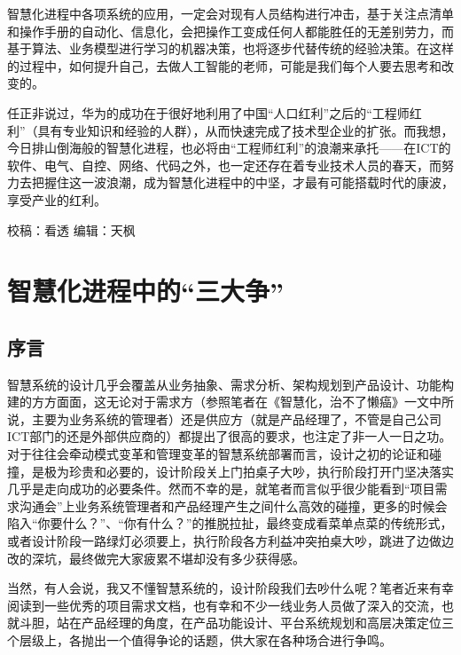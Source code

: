 \documentclass[]{book}
\begin{document}
智慧化进程中各项系统的应用，一定会对现有人员结构进行冲击，基于关注点清单和操作手册的自动化、信息化，会把操作工变成任何人都能胜任的无差别劳力，而基于算法、业务模型进行学习的机器决策，也将逐步代替传统的经验决策。在这样的过程中，如何提升自己，去做人工智能的老师，可能是我们每个人要去思考和改变的。

任正非说过，华为的成功在于很好地利用了中国``人口红利''之后的``工程师红利''（具有专业知识和经验的人群），从而快速完成了技术型企业的扩张。而我想，今日排山倒海般的智慧化进程，也必将由``工程师红利''的浪潮来承托------在ICT的软件、电气、自控、网络、代码之外，也一定还存在着专业技术人员的春天，而努力去把握住这一波浪潮，成为智慧化进程中的中坚，才最有可能搭载时代的康波，享受产业的红利。

校稿：看透
编辑：天枫

\hypertarget{ux667aux6167ux5316ux8fdbux7a0bux4e2dux7684ux4e09ux5927ux4e89}{%
\section{智慧化进程中的``三大争''}\label{ux667aux6167ux5316ux8fdbux7a0bux4e2dux7684ux4e09ux5927ux4e89}}

\hypertarget{ux5e8fux8a00-1}{%
\subsection{序言}\label{ux5e8fux8a00-1}}

智慧系统的设计几乎会覆盖从业务抽象、需求分析、架构规划到产品设计、功能构建的方方面面，这无论对于需求方（参照笔者在《智慧化，治不了懒癌》一文中所说，主要为业务系统的管理者）还是供应方（就是产品经理了，不管是自己公司ICT部门的还是外部供应商的）都提出了很高的要求，也注定了非一人一日之功。对于往往会牵动模式变革和管理变革的智慧系统部署而言，设计之初的论证和碰撞，是极为珍贵和必要的，设计阶段关上门拍桌子大吵，执行阶段打开门坚决落实几乎是走向成功的必要条件。然而不幸的是，就笔者而言似乎很少能看到``项目需求沟通会''上业务系统管理者和产品经理产生之间什么高效的碰撞，更多的时候会陷入``你要什么？''、``你有什么？''的推脱拉扯，最终变成看菜单点菜的传统形式，或者设计阶段一路绿灯必须要上，执行阶段各方利益冲突拍桌大吵，跳进了边做边改的深坑，最终做完大家疲累不堪却没有多少获得感。

当然，有人会说，我又不懂智慧系统的，设计阶段我们去吵什么呢？笔者近来有幸阅读到一些优秀的项目需求文档，也有幸和不少一线业务人员做了深入的交流，也就斗胆，站在产品经理的角度，在产品功能设计、平台系统规划和高层决策定位三个层级上，各抛出一个值得争论的话题，供大家在各种场合进行争鸣。
\end{document}
